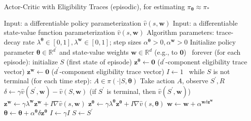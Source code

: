 \documentclass[12pt,a4paper]{article}
\begin{document}
\newpage

\begin{algorithm}
\caption{Actor-Critic with Eligibility Traces (episodic), for estimating $\pi_{\bm{\theta}} \approx \pi_{*}$}
\begin{algorithmic}
	\State Input: a differentiable policy parameterization $\hat{v}(s, \mathbf{w})$
	\State Input: a differentiable state-value function parameterization $\hat{v}(s, \mathbf{w})$
	\State Algorithm parameters: trace-decay rate $\lambda^{\bm{\theta}} \in [0, 1], \lambda^{\mathbf{w}} \in [0,1]$; step sizes $\alpha^{\bm{\theta}}>0, \alpha^{\mathbf{w}} > 0$
	\State Initialize policy parameter $\bm{\theta} \in \mathbb{R}^{d^{'}}$ and state-value weights $\mathbf{w} \in \mathbb{R}^{d}$ (e.g., to $\mathbf{0}$)
	\State	
	\Loop\ forever (for each episode):
		\State initialize $S$ (first state of episode)
		\State $\mathbf{z}^{\bm{\theta}} \leftarrow \mathbf{0}$ ($d^{'}$-component eligibility trace vector)
		\State $\mathbf{z}^{\mathbf{w}} \leftarrow \mathbf{0}$ ($d^{'}$-component eligibility trace vector)
		\State $I \leftarrow 1$
		\Loop\ while $S$ is not terminal (for each time step):
			\State $A \in \pi(\cdot|S, \bm{\theta})$
			\State Take action $A$, observe $S^{'}, R$
			\State $\delta \leftarrow \gamma\hat{v}(S^{'}, \mathbf{w}) - \hat{v}(S, \mathbf{w})$  \qquad  (if $S^{'}$ is terminal, then $\hat{v}(S^{'}, \mathbf{w})$)
			\State $\mathbf{z}^{\mathbf{w}} \leftarrow \gamma\lambda^{\mathbf{w}}\mathbf{z}^{\mathbf{w}} + I\nabla\hat{v}(s, \mathbf{w})$
			\State $\mathbf{z}^{\bm{\theta}} \leftarrow \gamma\lambda^{\bm{\theta}}\mathbf{z}^{\bm{\theta}} + I\nabla\hat{v}(s, \bm{\theta})$
			\State $\mathbf{w} \leftarrow \mathbf{w} + \alpha^{\mathbf{w}\delta\mathbf{z}^{\mathbf{w}}}$
			\State $\bm{\theta} \leftarrow \bm{\theta} + \alpha^{\mathbf{\theta}}\delta\mathbf{z}^{\bm{\theta}}$
			\State $I \leftarrow \gamma I$
			\State $S \leftarrow S^{'}$
		\EndLoop
	\EndLoop
\end{algorithmic}
\end{algorithm}

\newpage
\end{document}
